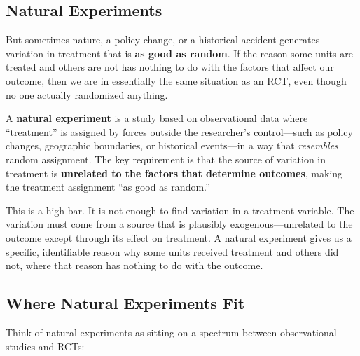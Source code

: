 \documentclass[
  letterpaper,
  DIV=11,
  numbers=noendperiod]{scrreprt}
\begin{document}
\subsection{Natural Experiments}\label{natural-experiments-1}

But sometimes nature, a policy change, or a historical accident
generates variation in treatment that is \textbf{as good as random}. If
the reason some units are treated and others are not has nothing to do
with the factors that affect our outcome, then we are in essentially the
same situation as an RCT, even though no one actually randomized
anything.

\begin{tcolorbox}[enhanced jigsaw, arc=.35mm, bottomrule=.15mm, bottomtitle=1mm, breakable, colback=white, colbacktitle=quarto-callout-note-color!10!white, colframe=quarto-callout-note-color-frame, coltitle=black, left=2mm, leftrule=.75mm, opacityback=0, opacitybacktitle=0.6, rightrule=.15mm, title=\textcolor{quarto-callout-note-color}{\faInfo}\hspace{0.5em}{Natural Experiments}, titlerule=0mm, toprule=.15mm, toptitle=1mm]

A \textbf{natural experiment} is a study based on observational data
where ``treatment'' is assigned by forces outside the researcher's
control---such as policy changes, geographic boundaries, or historical
events---in a way that \emph{resembles} random assignment. The key
requirement is that the source of variation in treatment is
\textbf{unrelated to the factors that determine outcomes}, making the
treatment assignment ``as good as random.''

\end{tcolorbox}

This is a high bar. It is not enough to find variation in a treatment
variable. The variation must come from a source that is plausibly
exogenous---unrelated to the outcome except through its effect on
treatment. A natural experiment gives us a specific, identifiable reason
why some units received treatment and others did not, where that reason
has nothing to do with the outcome.

\subsection{Where Natural Experiments
Fit}\label{where-natural-experiments-fit}

Think of natural experiments as sitting on a spectrum between
observational studies and RCTs:
\end{document}
